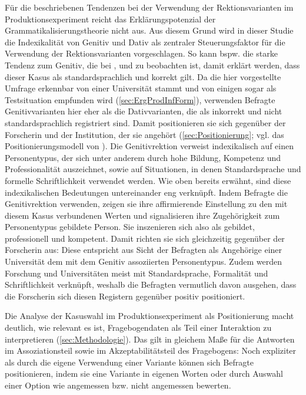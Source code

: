 Für die beschriebenen Tendenzen bei der Verwendung der Rektionsvarianten im Produktionsexperiment reicht das Erklärungspotenzial der Grammatikalisierungstheorie nicht aus. 
Aus diesem Grund wird in dieser Studie die Indexikalität von Genitiv und Dativ als zentraler Steuerungsfaktor für die Verwendung der Rektionsvarianten vorgeschlagen. 
So kann bspw. die starke Tendenz zum Genitiv, die bei \wegen{}, \waehrend{} und \dank{} zu beobachten ist, damit erklärt werden, dass dieser Kasus als standardsprachlich und korrekt gilt. 
Da die hier vorgestellte Umfrage erkennbar von einer Universität stammt und von einigen sogar als Testsituation empfunden wird (\autoref{sec:ErgProdInfForm}), verwenden Befragte Genitivvarianten hier eher als die Dativvarianten, die als inkorrekt und nicht standardsprachlich registriert sind. 
Damit positionieren sie sich gegenüber der Forscherin und der Institution, der sie angehört (\autoref{sec:Positionierung}; vgl. das Positionierungsmodell von \citealp{Spitzmuller2013}). 
Die Genitivrektion verweist indexikalisch auf einen Personentypus, der sich unter anderem durch hohe Bildung, Kompetenz und Professionalität auszeichnet, sowie auf Situationen, in denen Standardsprache und formelle Schriftlichkeit verwendet werden. 
Wie oben bereits erwähnt, sind diese indexikalischen Bedeutungen untereinander eng verknüpft. 
Indem Befragte die Genitivrektion verwenden, zeigen sie ihre affirmierende Einstellung zu den mit diesem Kasus verbundenen Werten und signalisieren ihre Zugehörigkeit zum Personentypus \glqq gebildete Person\grqq{}. 
Sie inszenieren sich also als gebildet, professionell und kompetent. 
Damit richten sie sich gleichzeitig gegenüber der Forscherin aus: 
Diese entspricht aus Sicht der Befragten als Angehörige einer Universität dem mit dem Genitiv assoziierten Personentypus. 
Zudem werden Forschung und Universitäten meist mit Standardsprache, Formalität und Schriftlichkeit verknüpft, weshalb die Befragten vermutlich davon ausgehen, dass die Forscherin sich diesen Registern gegenüber positiv positioniert. 

\begin{sloppypar}
Die Analyse der Kasuswahl im Produktionsexperiment als Positionierung macht deutlich, wie relevant es ist, Fragebogendaten als Teil einer Interaktion zu interpretieren (\autoref{sec:Methodologie}).
Das gilt in gleichem Maße für die Antworten im Assoziationsteil sowie im Akzeptabilitätsteil des Fragebogens:
Noch expliziter als durch die eigene Verwendung einer Variante können sich Befragte positionieren, indem sie eine Variante in eigenen Worten oder durch Auswahl einer Option wie \glqq angemessen\grqq{} bzw. \glqq nicht angemessen\grqq{} bewerten. 
\end{sloppypar}

